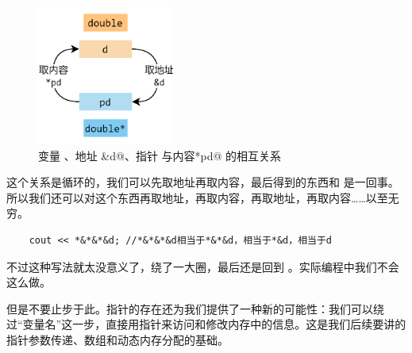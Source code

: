 \begin{figure}[htbp]
    \centering
    \includegraphics[width=0.4\textwidth]{../images/generalized_parts/05_relationship_between_variables_and_pointers.drawio.png}
    \caption{变量 \lstinline@d@、地址 \lstinline@&d@、指针 \lstinline@pd@ 与内容\lstinline@*pd@ 的相互关系}
\end{figure}
这个关系是循环的，我们可以先取地址再取内容，最后得到的东西和 \lstinline@d@ 是一回事。所以我们还可以对这个东西再取地址，再取内容，再取地址，再取内容……以至无穷。
\begin{lstlisting}
    cout << *&*&*&d; //*&*&*&d相当于*&*&d，相当于*&d，相当于d
\end{lstlisting}
不过这种写法就太没意义了，绕了一大圈，最后还是回到 \lstinline@d@。实际编程中我们不会这么做。\par
但是不要止步于此。指针的存在还为我们提供了一种新的可能性：我们可以绕过``变量名''这一步，直接用指针来访问和修改内存中的信息。这是我们后续要讲的指针参数传递、数组和动态内存分配的基础。\par
